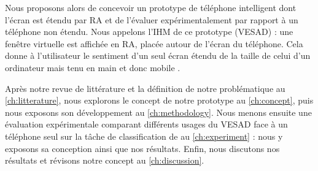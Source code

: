 

Nous proposons alors de concevoir un prototype de téléphone intelligent dont l'écran est étendu par RA et de l'évaluer expérimentalement par rapport à un téléphone non étendu. Nous appelons l'IHM de ce prototype  (VESAD) : une fenêtre virtuelle est affichée en RA, placée autour de l'écran du téléphone. Cela donne à l'utilisateur le sentiment d'un seul écran étendu de la taille de celui d'un ordinateur mais tenu en main et donc mobile .

Après notre revue de littérature et la définition de notre problématique au \autoref{ch:litterature}, nous explorons le concept de notre prototype au \autoref{ch:concept}, puis nous exposons son développement au \autoref{ch:methodology}. Nous menons ensuite une évaluation expérimentale comparant différents usages du VESAD face à un téléphone seul sur la tâche de classification de \cite{Liu2014} au \autoref{ch:experiment} : nous y exposons sa conception ainsi que nos résultats. Enfin, nous discutons nos résultats et révisons notre concept au \autoref{ch:discussion}.